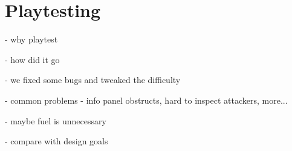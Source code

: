 \chapter{Playtesting}

- why playtest

- how did it go

- we fixed some bugs and tweaked the difficulty

- common problems - info panel obstructs, hard to inspect attackers, more...

- maybe fuel is unnecessary

- compare with design goals
